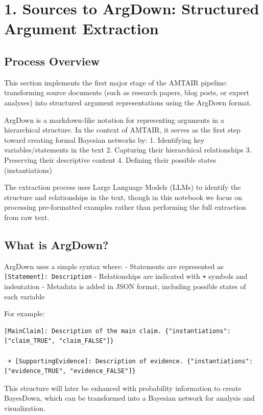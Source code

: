 \documentclass[
  11pt,
  letterpaper,
]{book}
\begin{document}
\chapter{1. Sources to ArgDown: Structured Argument
Extraction}\label{sources-to-argdown-structured-argument-extraction}

\section{Process Overview}\label{process-overview}

This section implements the first major stage of the AMTAIR pipeline:
transforming source documents (such as research papers, blog posts, or
expert analyses) into structured argument representations using the
ArgDown format.

ArgDown is a markdown-like notation for representing arguments in a
hierarchical structure. In the context of AMTAIR, it serves as the first
step toward creating formal Bayesian networks by: 1. Identifying key
variables/statements in the text 2. Capturing their hierarchical
relationships 3. Preserving their descriptive content 4. Defining their
possible states (instantiations)

The extraction process uses Large Language Models (LLMs) to identify the
structure and relationships in the text, though in this notebook we
focus on processing pre-formatted examples rather than performing the
full extraction from raw text.

\section{What is ArgDown?}\label{what-is-argdown}

ArgDown uses a simple syntax where: - Statements are represented as
\texttt{{[}Statement{]}:\ Description} - Relationships are indicated
with \texttt{+} symbols and indentation - Metadata is added in JSON
format, including possible states of each variable

For example:

\begin{verbatim}
[MainClaim]: Description of the main claim. {"instantiations": ["claim_TRUE", "claim_FALSE"]}

 + [SupportingEvidence]: Description of evidence. {"instantiations": ["evidence_TRUE", "evidence_FALSE"]}
\end{verbatim}

This structure will later be enhanced with probability information to
create BayesDown, which can be transformed into a Bayesian network for
analysis and visualization.
\end{document}
